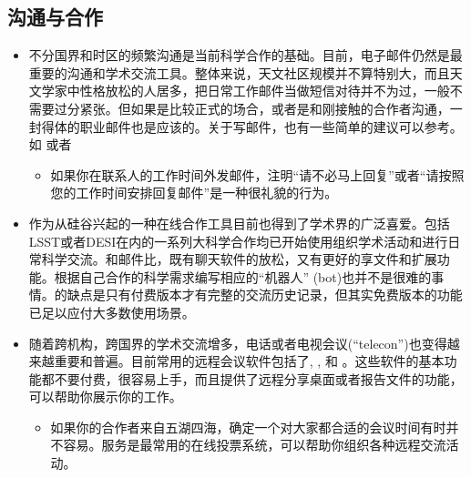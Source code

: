\documentclass[letterpaper,10pt,english]{sphinxmanual}
\begin{document}
\subsection{沟通与合作}
\label{\detokenize{resource/research/getting_started_cn:id18}}\begin{itemize}
\item {} 
不分国界和时区的频繁沟通是当前科学合作的基础。目前，电子邮件仍然是最重要的沟通和学术交流工具。整体来说，天文社区规模并不算特别大，而且天文学家中性格放松的人居多，把日常工作邮件当做短信对待并不为过，一般不需要过分紧张。但如果是比较正式的场合，或者是和刚接触的合作者沟通，一封得体的职业邮件也是应该的。关于写邮件，也有一些简单的建议可以参考。如
或者
\begin{itemize}
\item {} 
如果你在联系人的工作时间外发邮件，注明“请不必马上回复”或者“请按照您的工作时间安排回复邮件”是一种很礼貌的行为。

\end{itemize}

\item {} 
作为从硅谷兴起的一种在线合作工具目前也得到了学术界的广泛喜爱。包括LSST或者DESI在内的一系列大科学合作均已开始使用组织学术活动和进行日常科学交流。和邮件比，既有聊天软件的放松，又有更好的享文件和扩展功能。根据自己合作的科学需求编写相应的“机器人”
(bot)也并不是很难的事情。的缺点是只有付费版本才有完整的交流历史记录，但其实免费版本的功能已足以应付大多数使用场景。

\item {} 
随着跨机构，跨国界的学术交流增多，电话或者电视会议(“telecon”)也变得越来越重要和普遍。目前常用的远程会议软件包括了,
, 和
。这些软件的基本功能都不要付费，很容易上手，而且提供了远程分享桌面或者报告文件的功能，可以帮助你展示你的工作。
\begin{itemize}
\item {} 
如果你的合作者来自五湖四海，确定一个对大家都合适的会议时间有时并不容易。服务是最常用的在线投票系统，可以帮助你组织各种远程交流活动。

\end{itemize}

\end{itemize}
\end{document}
